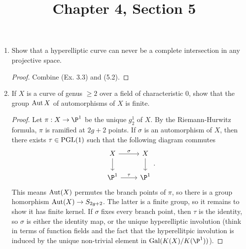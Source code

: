 \documentclass[a4paper]{article}
\title{Chapter 4, Section 5}
\begin{document}
\maketitle

\begin{enumerate} [label=\textbf{\arabic*.}, leftmargin=0em]

  \item Show that a hyperelliptic curve can never be a complete intersection in any projective space.

        \begin{proof}
          Combine (Ex. 3.3) and (5.2).
        \end{proof}

  \item If $X$ is a curve of genus $\geq 2$ over a field of characteristic 0, show that the group $\operatorname{Aut}{X}$ of automorphisms of $X$ is finite.

        \begin{proof}
           Let $\pi : X \to \P^1$ be the unique $g^1_2$ of $X$.
          By the Riemann-Hurwitz formula, $\pi$ is ramified at $2g + 2$ points.
          If $\sigma$ is an automorphism of $X$, then there exists $\tau \in \operatorname{PGL}(1)$ such that the following diagram commutes
          \[ \begin{tikzcd}
              X \arrow[r, "\sigma"] \arrow[d] & X \arrow[d] \\
              \P^1 \arrow[r, "\tau"]                  & \P^1
            \end{tikzcd}. \]
          This means $\operatorname{Aut}(X)$ permutes the branch points of $\pi$, so there is a group homorphism $\operatorname{Aut}(X) \to S_{2g + 2}$.
          The latter is a finite group, so it remains to show it has finite kernel.
          If $\sigma$ fixes every branch point, then $\tau$ is the identity, so $\sigma$ is either the identity map, or the unique hyperelliptic involution (think in terms of function fields and the fact that the hyperellitpic involution is induced by the unique non-trivial element in $\Gal(K(X)/K(\P^1))$).


\end{proof}
\end{enumerate}
\end{document}
